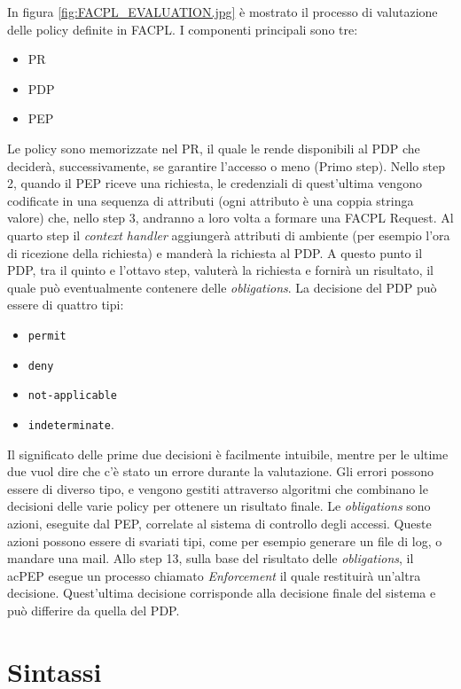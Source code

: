 In figura \ref{fig:FACPL_EVALUATION.jpg} è mostrato il processo di valutazione delle policy definite in FACPL.
I componenti principali sono tre:
\begin{itemize}
\item{\acf{PR}}
\item{\acf{PDP}}
\item{\acf{PEP}}
\end{itemize}
Le policy sono memorizzate nel \ac{PR}, il quale le rende disponibili al \ac{PDP} che deciderà, successivamente, se garantire l'accesso o meno (Primo step).
Nello step 2, quando il \ac{PEP} riceve una richiesta, le credenziali di quest'ultima vengono codificate in una sequenza di attributi (ogni attributo è una coppia stringa valore) che, nello step 3, andranno a loro volta a formare una \ac{FACPL} Request.
Al quarto step il \textit{context handler} aggiungerà attributi di ambiente (per esempio l'ora di ricezione della richiesta) e manderà la richiesta al \ac{PDP}.
A questo punto il \ac{PDP}, tra il quinto e l'ottavo step, valuterà la richiesta e fornirà un risultato, il quale può eventualmente contenere delle \textit{obligations}.
La decisione del \ac{PDP} può essere di quattro tipi:
\begin{itemize}
\item \texttt{permit}
\item \texttt{deny}
\item \texttt{not-applicable} 
\item \texttt{indeterminate}.
\end{itemize}
Il significato delle prime due decisioni è facilmente intuibile, mentre per le ultime due vuol dire che c'è stato un errore durante la valutazione.
Gli errori possono essere di diverso tipo, e vengono gestiti attraverso algoritmi che combinano le decisioni delle varie policy per ottenere un risultato finale.
Le \textit{obligations} sono azioni, eseguite dal \ac{PEP}, correlate al sistema di controllo degli accessi. Queste azioni possono essere di svariati tipi, come per esempio generare un file di log, o mandare una mail.
Allo step 13, sulla base del risultato delle \textit{obligations}, il ac{PEP} esegue un processo chiamato \textit{Enforcement} il quale restituirà un'altra decisione.
Quest'ultima decisione corrisponde alla decisione finale del sistema e può differire da quella del PDP.


\section{Sintassi}
\label{sec:facpl_syntax}

